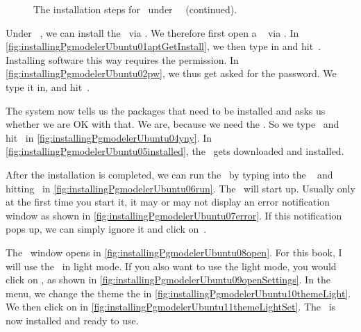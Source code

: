 \begin{figure}%
\ContinuedFloat%
\centering%
%
%
%
\floatRowSep%
%
%
%
\floatRowSep%
%
%
%
\floatSep%
%
%
%
\caption{The installation steps for \pgmodeler\ under \ubuntu\ \linux~(continued).}%
\label{fig:installingPgmodelerUbuntu:C}%
\end{figure}%
%
Under \ubuntu\ \linux, we can install the \pgmodeler\ via .
We therefore first open a \bash\  via \ubuntuTerminal.
In \cref{fig:installingPgmodelerUbuntu01aptGetInstall}, we then type in  and hit~\keys{\enter}.
Installing software this way requires the  permission.
In \cref{fig:installingPgmodelerUbuntu02pw}, we thus get asked for the  password.
We type it in, and hit~\keys{\enter}.

The system now tells us the packages that need to be installed and asks us whether we are OK with that.
We are, because we need the \pgmodeler.
So we type~ and hit~\keys{\enter} in \cref{fig:installingPgmodelerUbuntu04yny}.%
In \cref{fig:installingPgmodelerUbuntu05installed}, the \pgmodeler\ gets downloaded and installed.

After the installation is completed, we can run the \pgmodeler\ by typing  into the \bash\  and hitting~\keys{\enter} in \cref{fig:installingPgmodelerUbuntu06run}.
The \pgmodeler\ will start up.
Usually only at the first time you start it, it may or may not display an error notification window as shown in \cref{fig:installingPgmodelerUbuntu07error}.
If this notification pops up, we can simply ignore it and click on~.

The \pgmodeler\ window opens in \cref{fig:installingPgmodelerUbuntu08open}.
For this book, I will use the \pgmodeler\ in light mode.
If you also want to use the light mode, you would click on , as shown in \cref{fig:installingPgmodelerUbuntu09openSettings}.
In the  menu, we change the theme the  in \cref{fig:installingPgmodelerUbuntu10themeLight}.
We then click on  in \cref{fig:installingPgmodelerUbuntu11themeLightSet}.
The \pgmodeler\ is now installed and ready to use.%
\FloatBarrier%
\endhsection%
%
